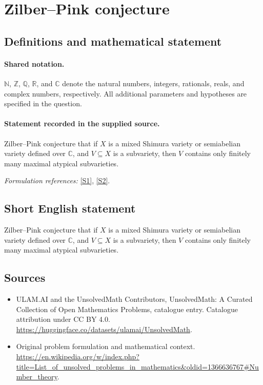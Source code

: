 \documentclass[11pt]{article}
\newcommand{\sref}[2]{\hyperlink{source:#1:#2}{[S#2]}}
\begin{document}
\section{Zilber–Pink conjecture}\label{statement}

\subsection{Definitions and mathematical statement}

\paragraph{Shared notation.}$\mathbb N$, $\mathbb Z$, $\mathbb Q$, $\mathbb R$, and $\mathbb C$ denote the natural numbers, integers, rationals, reals, and complex numbers, respectively. All additional parameters and hypotheses are specified in the question.


\paragraph{Statement recorded in the supplied source.}
Zilber–Pink conjecture that if $X$ is a mixed Shimura variety or semiabelian variety defined over $\mathbb{C}$, and $V \subseteq X$ is a subvariety, then $V$ contains only finitely many maximal atypical subvarieties.
\par\smallskip\textit{Formulation references:} \sref{statement}{1}, \sref{statement}{2}.
\subsection{Short English statement}
Zilber–Pink conjecture that if $X$ is a mixed Shimura variety or semiabelian variety defined over $\mathbb{C}$, and $V \subseteq X$ is a subvariety, then $V$ contains only finitely many maximal atypical subvarieties.
\subsection{Sources}
\begin{itemize}
\item[\hypertarget{source:statement:1}{S1}] ULAM.AI and the UnsolvedMath Contributors, UnsolvedMath: A Curated Collection of Open Mathematics Problems, catalogue entry. Catalogue attribution under CC BY 4.0.
\url{https://huggingface.co/datasets/ulamai/UnsolvedMath}.
\item[\hypertarget{source:statement:2}{S2}] Original problem formulation and mathematical context.
\url{https://en.wikipedia.org/w/index.php?title=List_of_unsolved_problems_in_mathematics&oldid=1366636767#Number_theory}.
\end{itemize}
\label{end:statement}
\end{document}

